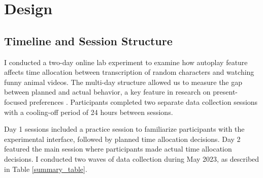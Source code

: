 \documentclass[11pt,a4paper,oneside]{article}
\begin{document}
\section{Design}\label{Design}

\subsection{Timeline and Session Structure}
I conducted a two-day online lab experiment to examine how autoplay feature affects time allocation between transcription of random characters and watching funny animal videos. The multi-day structure allowed us to measure the gap between planned and actual behavior, a key feature in research on present-focused preferences \citep{ericsonIntertemporalChoice2019}. Participants completed two separate data collection sessions with a cooling-off period of 24 hours between sessions.

Day 1 sessions included a practice session to familiarize participants with the experimental interface, followed by planned time allocation decisions. Day 2 featured the main session where participants made actual time allocation decisions. I conducted two waves of data collection during May 2023, as described in Table \ref{summary_table}.
\end{document}
